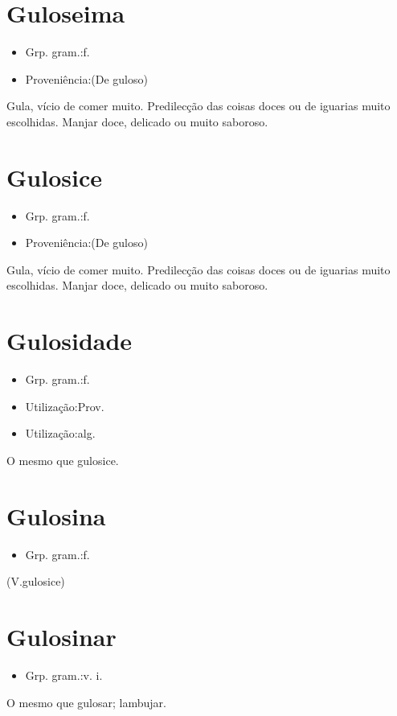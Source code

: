 \section{Guloseima}
\begin{itemize}
\item {Grp. gram.:f.}
\end{itemize}
\begin{itemize}
\item {Proveniência:(De \textunderscore guloso\textunderscore )}
\end{itemize}
Gula, vício de comer muito.
Predilecção das coisas doces ou de iguarias muito escolhidas.
Manjar doce, delicado ou muito saboroso.
\section{Gulosice}
\begin{itemize}
\item {Grp. gram.:f.}
\end{itemize}
\begin{itemize}
\item {Proveniência:(De \textunderscore guloso\textunderscore )}
\end{itemize}
Gula, vício de comer muito.
Predilecção das coisas doces ou de iguarias muito escolhidas.
Manjar doce, delicado ou muito saboroso.
\section{Gulosidade}
\begin{itemize}
\item {Grp. gram.:f.}
\end{itemize}
\begin{itemize}
\item {Utilização:Prov.}
\end{itemize}
\begin{itemize}
\item {Utilização:alg.}
\end{itemize}
O mesmo que \textunderscore gulosice\textunderscore .
\section{Gulosina}
\begin{itemize}
\item {Grp. gram.:f.}
\end{itemize}
(V.gulosice)
\section{Gulosinar}
\begin{itemize}
\item {Grp. gram.:v. i.}
\end{itemize}
O mesmo que \textunderscore gulosar\textunderscore ; lambujar.
